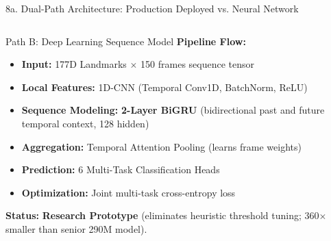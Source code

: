 \documentclass[aspectratio=169]{beamer}
\begin{document}
\begin{frame}[t]{8a. Dual-Path Architecture: Production Deployed vs. Neural Network}
\begin{columns}[T]
    \begin{block}{Path B: Deep Learning Sequence Model}
        \fontsize{6.8pt}{8.6pt}\selectfont
        \textbf{Pipeline Flow:}
        \begin{itemize}\setlength{\itemsep}{1.2pt}
            \item \textbf{Input:} 177D Landmarks $\times$ 150 frames sequence tensor
            \item \textbf{Local Features:} 1D-CNN (Temporal Conv1D, BatchNorm, ReLU)
            \item \textbf{Sequence Modeling:} \textbf{2-Layer BiGRU} (bidirectional past and future temporal context, 128 hidden)
            \item \textbf{Aggregation:} Temporal Attention Pooling (learns frame weights)
            \item \textbf{Prediction:} 6 Multi-Task Classification Heads
            \item \textbf{Optimization:} Joint multi-task cross-entropy loss
        \end{itemize}
        \vspace{1mm}
        \textbf{Status:} \textcolor{blue!80!black}{\textbf{Research Prototype}} (eliminates heuristic threshold tuning; 360$\times$ smaller than senior 290M model).
    \end{block}
\end{columns}

\vspace{1.5mm}
\centering
{}
\end{frame}


\end{document}

